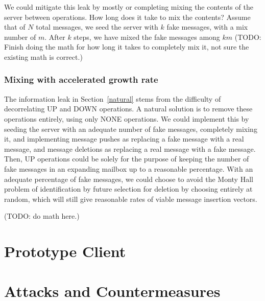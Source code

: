 \documentclass[pageno]{jpaper}
\begin{document}
We could mitigate this leak by mostly or completing mixing the contents of the server between operations. How long does it take to mix the contents? Assume that of $N$ total messages, we seed the server with $k$ fake messages, with a mix number of $m$. After $k$ steps, we have mixed the fake messages among $km$ (TODO: Finish doing the math for how long it takes to completely mix it, not sure the existing math is correct.)

\subsubsection{Mixing with accelerated growth rate}
The information leak in Section~\ref{natural} stems from the difficulty of decorrelating UP and DOWN operations. A natural solution is to remove these operations entirely, using only NONE operations. We could implement this by seeding the server with an adequate number of fake messages, completely mixing it, and implementing message pushes as replacing a fake message with a real message, and message deletions as replacing a real message with a fake message. Then, UP operations could be solely for the purpose of keeping the number of fake messages in an expanding mailbox up to a reasonable percentage. With an adequate percentage of fake messages, we could choose to avoid the Monty Hall problem of identification by future selection for deletion by choosing entirely at random, which will still give reasonable rates of viable message insertion vectors.

(TODO: do math here.)


\section{Prototype Client}



\section{Attacks and Countermeasures}
\end{document}
